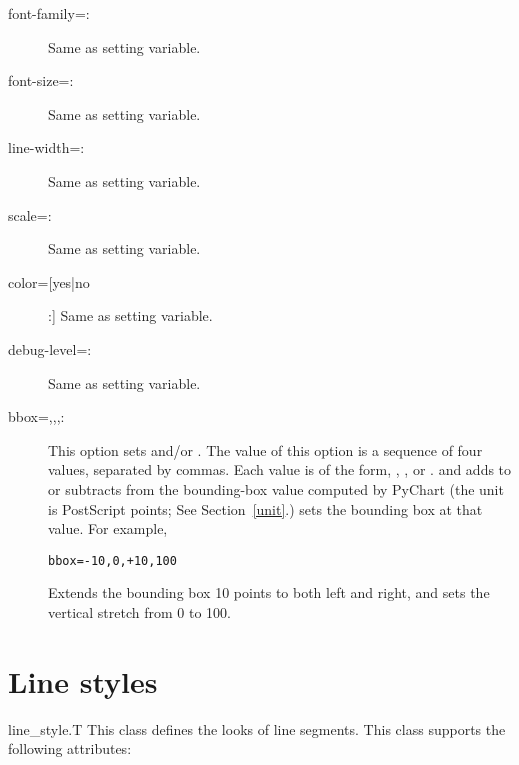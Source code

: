\documentclass{howto}
\newcommand{\pychart}{PyChart}
\newcommand{\xref}[1]{See Section~\ref{#1}}
\begin{document}
\begin{description}
\item[font-family=:]
 Same as setting  variable.

\item[font-size=:]
 Same as setting  variable.

\item[line-width=:]
  Same as setting  variable.

\item[scale=:]
  Same as setting  variable.

\item[color=[yes|no]:]
  Same as setting  variable.

\item[debug-level=:]
Same as setting  variable.

\item[bbox=,,,:]
This option sets  and/or
.
The value of this option is a sequence of four values, separated by
commas. Each value is of the form, \code{+}, \code{-},
or . \code{+} and \code{-} adds to or subtracts
from the bounding-box value computed by \pychart{} (the unit is PostScript
points; \xref{unit}.)  sets the bounding box at that value. For
example,

\begin{verbatim}
bbox=-10,0,+10,100
\end{verbatim}

Extends the bounding box 10 points to both left and right, and sets the
vertical stretch from 0 to 100.
\end{description}

\section{Line styles}


\begin{classdesc*}{line_style.T}
This class defines the looks of line segments.
This class supports the following attributes:
\end{classdesc*}
\end{document}
